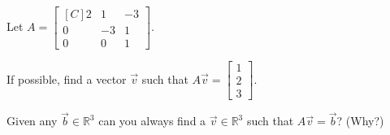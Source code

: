 \begin{exercise}
Let $A=\begin{bmatrix*}[C]
2 & 1  & -3\\
0 & -3 & 1 \\
0 & 0 & 1 
\end{bmatrix*}$.\\
\begin{inparaenum}
\item If possible, find a vector $\vec{v}$ such that 
$A\vec{v}=\begin{bmatrix}1 \\ 2 \\ 3\end{bmatrix}$.\\
%
\item Given any $\vec{b} \in \mathbb{R}^3$ can you always find a 
$\vec{v} \in \mathbb{R}^3$ such that $A\vec{v}=\vec{b}$? (Why?)
\end{inparaenum}
\end{exercise}
